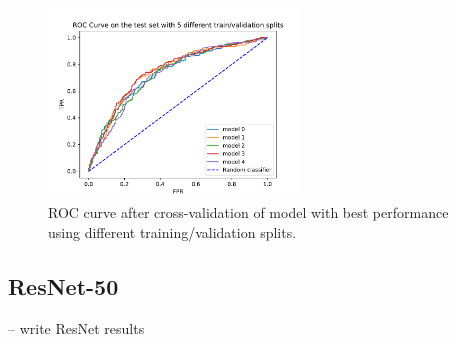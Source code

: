 \documentclass[sn-mathphys,Numbered]{sn-jnl}%
\theoremstyle{thmstyleone}%
\theoremstyle{thmstyletwo}%
\theoremstyle{thmstylethree}%
\begin{document}
\begin{figure}[h]%
\centering
\includegraphics[width=0.6\textwidth]{final_roc.pdf}
\caption{ROC curve after cross-validation of model with best performance using different training/validation splits.}\label{final-roc}
\end{figure}

\subsection{ResNet-50}\label{ResNet_Results}
-- write ResNet results
\end{document}
